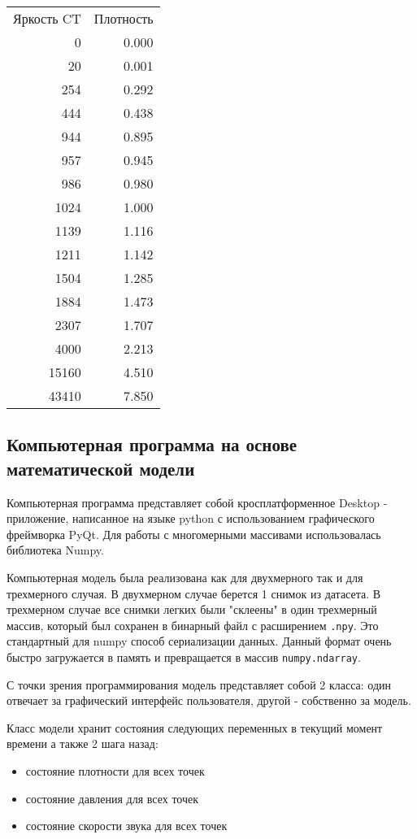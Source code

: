 \documentclass[../main.tex]{subfiles}
\begin{document}
\begin{center}
\begin{tabular}{ |r|r| } 
 \hline
 Яркость CT & Плотность \\
 0     & 0.000 \\
 20    & 0.001 \\
 254   & 0.292 \\
 444   & 0.438 \\
 944   & 0.895 \\
 957   & 0.945 \\
 986   & 0.980 \\
 1024  & 1.000 \\
 1139  & 1.116 \\
 1211  & 1.142 \\
 1504  & 1.285 \\
 1884  & 1.473 \\
 2307  & 1.707 \\
 4000  & 2.213 \\
 15160 & 4.510 \\
 43410 & 7.850 \\
 \hline
\end{tabular}
\end{center}

\subsection{Компьютерная программа на основе математической модели}
Компьютерная программа представляет собой кросплатформенное Desktop - приложение, написанное на языке python с использованием графического фреймворка PyQt. Для работы с многомерными массивами использовалась библиотека Numpy.

Компьютерная модель была реализована как для двухмерного так и для трехмерного случая. В двухмерном случае берется 1 снимок из датасета. В трехмерном случае все снимки легких были "склеены" в один трехмерный массив, который был сохранен в бинарный файл с расширением \texttt{.npy}. Это стандартный для numpy способ сериализации данных. Данный формат очень быстро загружается в память и превращается в массив \texttt{numpy.ndarray}.

С точки зрения программирования модель представляет собой 2 класса: один отвечает за графический интерфейс пользователя, другой - собственно за модель.

Класс модели хранит состояния следующих переменных в текущий момент времени а также 2 шага назад:

\begin{itemize}
    \item состояние плотности для всех точек
    \item состояние давления для всех точек
    \item состояние скорости звука для всех точек
\end{itemize}
\end{document}
